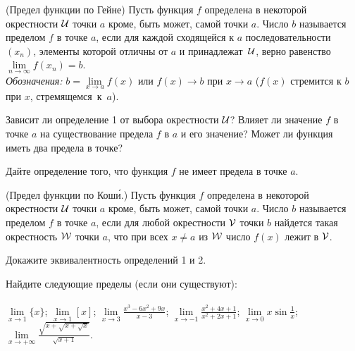 \documentclass[a4paper, 12pt]{article}
\newcommand{\0}[1]{\overline{#1}}
\begin{document}

 \label{lim2} {\small\sc (Предел функции по Гейне)} Пусть функция $f$ определена
в некоторой окрестности $\cal U$ точки $a$ кроме, быть может, самой точки $a$.
Число $b$ называется пределом $f$ в точке $a$, если
для каждой сходящейся к $a$ последовательности $(x_n)$,
элементы которой отличны от $a$ и принадлежат~$\cal U$, верно равенство $\lim\limits_{n \to \infty} f(x_n)=b$.\\
{\sl Обозначения:}
$b=\lim\limits_{x \to a} f(x)$ или $f(x)\to b$ при $x\to a$
( $f(x)$ стремится к $b$ при $x$, стремящемся~к~$a$).

 Зависит ли определение 1 от выбора окрестности $\cal U$?
 Влияет ли значение $f$ в точке $a$ на существование предела $f$ в $a$ и его значение?
 Может ли функция иметь два предела в точке?

 Дайте определение того, что функция $f$ не имеет предела в точке $a$.

 \label{epsilon-delta}  {\small\sc (Предел функции по Кош\'и.)}
Пусть функция $f$ определена в некоторой окрестности $\cal U$ точки $a$ кроме, быть может, самой точки $a$.
Число $b$ называется пределом $f$ в точке $a$, если для любой окрестности $\cal V$ точки $b$
найдется такая окрестность $\cal W$ точки $a$, что при всех $x\ne a$ из $\cal W$
число $f(x)$ лежит в $\cal V$.

Докажите эквивалентность определений 1 и 2.


\label{example}  Найдите следующие пределы (если они существуют):\\
\vspace*{-19pt}
\\
 $\lim\limits_{x\to1}\{ x\}$;
 $\lim\limits_{x\to1}[x]$;
 $\lim\limits_{x \to 3} \frac{x^3-6x^2+9x}{x-3}$;
 $\lim\limits_{x \to -1} \frac{x^2+4x+1}{x^2+2x+1}$;
 $\lim\limits_{x \to 0} x\sin \frac1x$;
 $\lim\limits_{x \to +\infty} \frac{\sqrt{x+\sqrt{x+\sqrt x}}}{\sqrt{x+1}}$.
\end{document}
